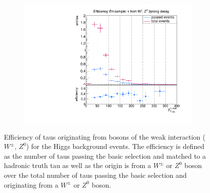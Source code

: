\begin{figure}
\begin{subfigure}[t]{0.49\textwidth}
                \label{Dividedprompt:bg:1prong}
                \end{subfigure}
                \begin{subfigure}[t]{0.49\textwidth}
                \includegraphics[width=\textwidth]{figures/plots/ttH/Divided_prompt3prong.pdf}
                \label{Dividedprompt:bg:3prong}
                \end{subfigure}
\caption[Efficiency of taus originating from bosons of the weak interaction ($W^\pm$, $Z^0$) for the Higgs background events.]{Efficiency of taus originating from bosons of the weak interaction ($W^\pm$, $Z^0$) for the Higgs background events. The efficiency is defined as the number of taus passing the basic selection and matched to a hadronic truth tau as well as the origin is from a $W^\pm$ or $Z^0$ boson over the total number of taus passing the basic selection and originating from a $W^\pm$ or $Z^0$ boson.}
\label{Dividedprompt:bg:ttH}
\end{figure}
%
%
